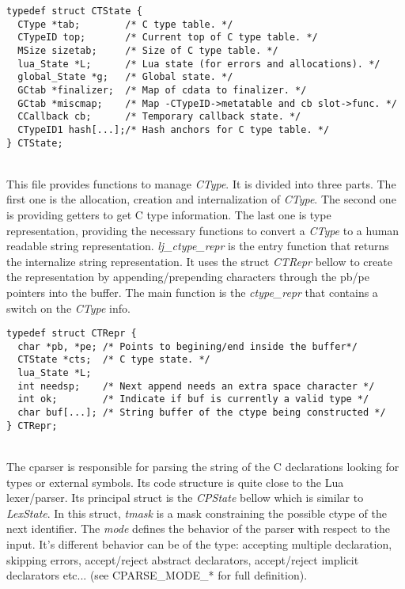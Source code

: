 \begin{adjustbox}
\begin{minipage}{\linewidth}
\begin{lstlisting}[style=CStyle]
typedef struct CTState {
  CType *tab;        /* C type table. */
  CTypeID top;       /* Current top of C type table. */
  MSize sizetab;     /* Size of C type table. */
  lua_State *L;      /* Lua state (for errors and allocations). */
  global_State *g;   /* Global state. */
  GCtab *finalizer;  /* Map of cdata to finalizer. */
  GCtab *miscmap;    /* Map -CTypeID->metatable and cb slot->func. */
  CCallback cb;      /* Temporary callback state. */
  CTypeID1 hash[...];/* Hash anchors for C type table. */
} CTState;
\end{lstlisting}
\end{minipage}
\end{adjustbox}

\\
This file provides functions to manage \emph{CType}. It is divided into three
parts. The first one is the allocation, creation and internalization of
\emph{CType}. The second one is providing getters to get C type information.
The last one is  type representation, providing the necessary functions to
convert a \emph{CType} to a human readable string representation.
\emph{lj\_ctype\_repr} is the entry function that returns the internalize string
representation. It uses the struct \emph{CTRepr} bellow to create the
representation by appending/prepending characters through the pb/pe pointers
into the buffer. The main function is the \emph{ctype\_repr} that contains a
switch on the \emph{CType} info.

\begin{lstlisting}[style=CStyle]
typedef struct CTRepr {
  char *pb, *pe; /* Points to begining/end inside the buffer*/
  CTState *cts;  /* C type state. */
  lua_State *L;
  int needsp;    /* Next append needs an extra space character */
  int ok;        /* Indicate if buf is currently a valid type */
  char buf[...]; /* String buffer of the ctype being constructed */
} CTRepr;
\end{lstlisting}

\\
The cparser is responsible for parsing the string of the C declarations looking
for types or external symbols. Its code structure is quite close to the
Lua lexer/parser. Its principal struct is the \emph{CPState} bellow which is
similar to \emph{LexState}. In this struct, \emph{tmask} is a mask constraining
the possible ctype of the next identifier. The \emph{mode} defines the behavior
of the parser with respect to the input. It's different behavior can be of the
type: accepting multiple declaration, skipping errors, accept/reject abstract
declarators, accept/reject implicit declarators etc... (see CPARSE\_MODE\_* for
full definition).

